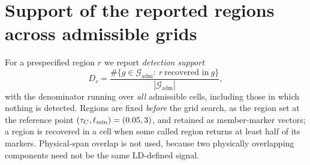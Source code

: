 \section{Support of the reported regions across admissible grids}

For a prespecified region $r$ we report \emph{detection support}
\[
  D_r=\frac{\#\{g\in\mathcal{G}_{\mathrm{adm}}:\ r\ \text{recovered in}\ g\}}
           {|\mathcal{G}_{\mathrm{adm}}|},
\]
with the denominator running over \emph{all} admissible cells, including those in
which nothing is detected. Regions are fixed \emph{before} the grid search, as the
region set at the reference point $(\tau_C,\ell_{\min})=(0.05,3)$, and retained as
member-marker vectors; a region is recovered in a cell when some called region returns
at least half of its markers. Physical-span overlap is not used, because two
physically overlapping components need not be the same LD-defined signal.

